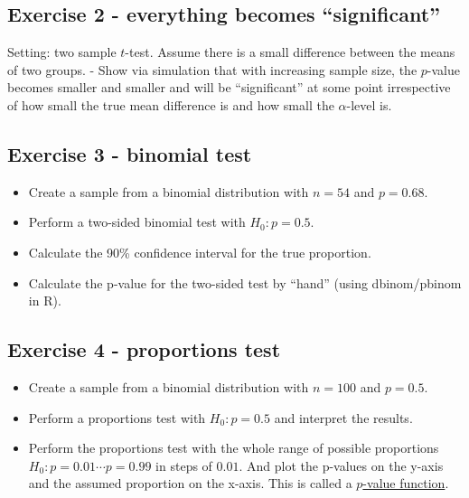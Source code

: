 \documentclass[
]{book}
\providecommand{\tightlist}{%
  \setlength{\itemsep}{0pt}\setlength{\parskip}{0pt}}
\begin{document}
\subsection{Exercise 2 - everything becomes ``significant''}\label{exercise2_nhst}

Setting: two sample \(t\)-test. Assume there is a small difference between the means of two groups.
- Show via simulation that with increasing sample size, the \(p\)-value becomes smaller and
smaller and will be ``significant'' at some point irrespective of how small the true mean
difference is and how small the \(\alpha\)-level is.

\subsection{Exercise 3 - binomial test}\label{exercise3_nhst}

\begin{itemize}
\tightlist
\item
  Create a sample from a binomial distribution with \(n = 54\) and \(p = 0.68\).
\item
  Perform a two-sided binomial test with \(H_0: p = 0.5\).
\item
  Calculate the 90\% confidence interval for the true proportion.
\item
  Calculate the p-value for the two-sided test by ``hand'' (using dbinom/pbinom in R).
\end{itemize}

\subsection{Exercise 4 - proportions test}\label{exercise4_nhst}

\begin{itemize}
\tightlist
\item
  Create a sample from a binomial distribution with \(n = 100\) and \(p = 0.5\).
\item
  Perform a proportions test with \(H_0: p = 0.5\) and interpret the results.
\item
  Perform the proportions test with the whole range of possible proportions
  \(H_0: p = 0.01 \cdots p = 0.99\) in steps of \(0.01\).
  And plot the p-values on the y-axis and
  the assumed proportion on the x-axis.
  This is called a \href{https://www.tandfonline.com/doi/full/10.1080/00031305.2018.1556735\#:~:text=The\%20p\%2Dvalue\%20function\%20provides,for\%20the\%20parameter\%20of\%20interest.}{\(p\)-value function}.
\end{itemize}
\end{document}
